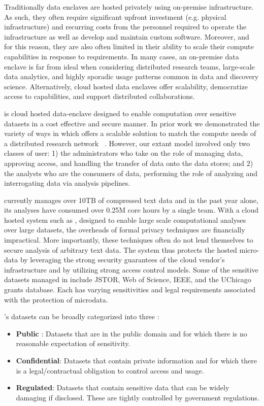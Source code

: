 Traditionally data enclaves are hosted privately using on-premise infrastructure. As
such, they often require significant upfront investment (e.g. physical infrastructure) and recurring costs 
from the personnel required to operate the infrastructure as well as develop and maintain custom software. 
Moreover, and for this reason, they are also often limited in their ability to scale their
compute capabilities in response to requirements. In many cases, an on-premise data enclave is far from ideal
when considering distributed research teams, large-scale data analytics, and highly sporadic
usage patterns common in data and discovery science. Alternatively, cloud hosted data enclaves offer scalability,
democratize access to capabilities, and support distributed collaborations. 

\NAME is cloud hosted data-enclave designed to enable computation over sensitive datasets
in a cost effective and secure manner. In prior work we demonstrated the variety of ways in which \NAME offers
a scalable solution to match the compute needs of a distributed research network ~\cite{babuji2016cloud, babuji2016secure}.
However, our extant model involved only two classes of user: 1) the administrators who take on the role of
managing data, approving access, and handling the transfer of data onto the data stores; and 2) the analysts
who are the consumers of data, performing the role of analyzing and interrogating data
via analysis pipelines.

\NAME currently manages over 10TB of compressed text data and in the past year
alone, its analyses have consumed over 0.25M core hours by a single team. With a cloud hosted system
such as \NAMENS, designed to enable large scale computational analyses over large datasets,
the overheads of formal privacy techniques are financially impractical. More importantly,
these techniques often do not lend themselves to secure analysis of arbitrary text data. 
The system thus protects the hosted micro-data by leveraging the strong security
guarantees of the cloud vendor's infrastructure and by utilizing strong access control
models. Some of the sensitive datasets managed in \NAME include JSTOR, Web of Science, IEEE,
and the UChicago grants database. Each has varying sensitivities and legal requirements associated with the
protection of microdata.

\NAMENS's datasets can be broadly categorized into three \cite{ist_dataclass}:
\begin{itemize}
\item \textbf{Public} : Datasets that are in the public domain and for which there is no
  reasonable expectation of sensitivity.
\item \textbf{Confidential}: Datasets that contain private information and for which there is a legal/contractual obligation to control access and usage.
\item \textbf {Regulated}: Datasets that contain sensitive data that can be widely damaging if disclosed.
  These are tightly controlled by government regulations.
\end{itemize}

